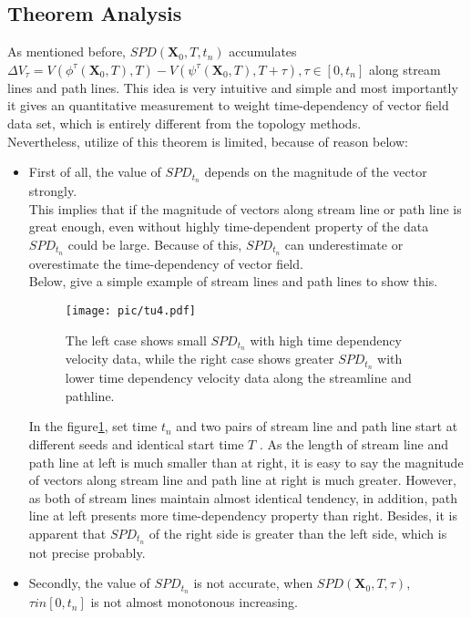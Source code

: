 \documentclass[
     11pt,         %
     a4paper,      %
     oneside,
     ]{article}
\newcommand{\vect}[1]{\boldsymbol{#1}}
\begin{document}
    \subsection{Theorem Analysis}
    As mentioned before, $SPD(\vect{X}_{0},T,t_{n})$ accumulates $\Delta V_{\tau}=V(\phi^{\tau}(\vect{X}_{0},T),T)-V(\psi^{\tau}(\vect{X}_{0},T),T+\tau), \tau\in[0,t_{n}]$ along stream lines and path lines. This idea is very intuitive and simple and most importantly it gives an quantitative measurement to weight time-dependency of vector field data set, which is entirely different from the topology methods.\\
    Nevertheless, utilize of this theorem is limited, because of reason below:
    \begin{itemize}
    	\item First of all, the value of $SPD_{t_{n}}$ depends on the magnitude of the vector strongly.\\ 
    	This implies that if the magnitude of vectors along stream line or path line is great enough, even without highly time-dependent property of the data  $SPD_{t_{n}}$ could be large. Because of this, $SPD_{t_{n}}$ can underestimate or overestimate the time-dependency of vector field.\\
    	Below, give a simple example of stream lines and path lines to show this.\\
    	\begin{figure}[H]
    		\centering
    		\texttt{[image: pic/tu4.pdf]}
    		\caption{\tiny The left case shows small $SPD_{t_{n}}$ with high time dependency velocity data, while the right case shows greater $SPD_{t_{n}}$ with lower time dependency velocity data along the streamline and pathline.}
    		\label{fig:NorSPD}
    	\end{figure}
    	In the figure\ref{fig:NorSPD}, set time $t_{n}$ and two pairs of stream line and path line start at different seeds and identical start time $T$ . As the length of stream line and path line at left is much smaller than at right, it is easy to say the magnitude of vectors along stream line and path line at right is much greater. However, as both of stream lines maintain almost identical tendency, in addition, path line at left presents more time-dependency property than right. Besides, it is  apparent that $SPD_{t_{n}}$ of the right side is greater than the left side, which is not precise probably.
    	\item Secondly, the value of $SPD_{t_{n}}$ is not accurate, when $SPD(\vect{X}_{0},T,\tau)$,$\tau in [0, t_{n}]$ is not almost monotonous increasing.\\

\end{itemize}
\end{document}
